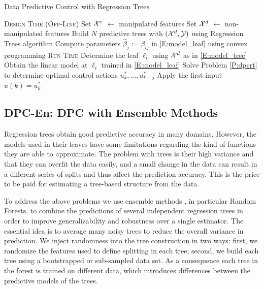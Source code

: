 \textcolor[rgb]{0,0,1}{\begin{algorithm}[ht!]
	\caption{Data Predictive Control with Regression Trees}
	\label{A:dpcrt}
	\begin{algorithmic}[1]
		\State \textsc{Design Time (Off-Line)}
		\State Set $\mathcal{X}^c$ $\gets$ manipulated features
		\State Set $\mathcal{X}^d$ $\gets$ non-manipulated features
		\State Build $N$ predictive trees with $(\mathcal{X}^d,\mathcal{Y})$ using Regression Trees algorithm
		\State Compute parameters $\hat\beta_j:=\beta_{ij}$ in \eqref{E:model_leaf} using convex programming
		\EndFor
		\EndFor
		\EndProcedure
		\State \textsc{Run Time}
		\State Determine the leaf $\ell_i$ using $\mathcal{X}^d$ as in \eqref{E:model_tree}
		\State Obtain the linear model at $\ell_i$ trained in \eqref{E:model_leaf}
		\EndFor
		\State Solve Problem \ref{P:dpcrt} to determine optimal
		\State control actions $u^*_k,\ldots,u^*_{k+j}$
		\State Apply the first input $u(k)=u^*_k$
		\EndWhile
		\EndProcedure
	\end{algorithmic}
\end{algorithm}}


\subsection{DPC-En: DPC with Ensemble Methods}
\label{SS:dpcrf}

\textcolor[rgb]{0,0,1}{Regression trees obtain good predictive accuracy in many domains. However, the models used in their leaves have some limitations regarding the kind of functions they are able to approximate. The problem with trees is their high variance and that they can overfit the data easily, and a small change in the data can result in a different series of splits and thus affect the prediction accuracy. This is the price to be paid for estimating a tree-based structure from the data.}

\textcolor[rgb]{0,0,1}{To address the above problems we use ensemble methods \cite{Friedman2001}, in particular Random Forests, to combine the predictions of several independent regression trees in order to improve generalizability and robustness over a single estimator. The essential idea is to average many noisy trees to reduce the overall variance in prediction. We inject randomness into the tree construction in two ways: first, we randomize the features used to define splitting in each tree; second, we build each tree using a bootstrapped or sub-sampled data set. As a consequence each tree in the forest is trained on different data, which introduces differences between the predictive models of the trees.}

